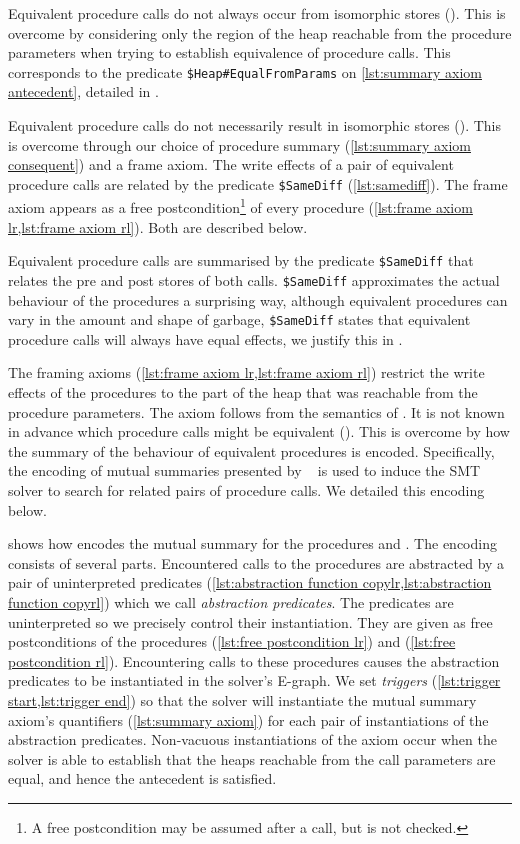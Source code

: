 \documentclass[runningheads,a4paper]{llncs}
\begin{document}
Equivalent procedure calls do not always occur from isomorphic stores (\textbf{\ctwo{}}). This is overcome by considering only the region of the heap reachable from the procedure parameters when trying to establish equivalence of procedure calls. This corresponds to the predicate \texttt{\$Heap\#EqualFromParams} on \cref{lst:summary axiom antecedent}, detailed in .

Equivalent procedure calls do not necessarily result in isomorphic stores (\textbf{\cthree}). This is overcome through our choice of procedure summary (\cref{lst:summary axiom consequent}) and a frame axiom. The write effects of a pair of equivalent procedure calls are related by the predicate \texttt{\$SameDiff} (\cref{lst:samediff}). The frame axiom appears as a free postcondition\footnote{A free postcondition may be assumed after a call, but is not checked.} of every procedure (\cref{lst:frame axiom lr,lst:frame axiom rl}).  Both are described below.

Equivalent procedure calls are summarised by the predicate \texttt{\$SameDiff} that relates the pre and post stores of both calls. \texttt{\$SameDiff} approximates the actual behaviour of the procedures a surprising way, although equivalent procedures can vary in the amount and shape of garbage, \texttt{\$SameDiff} states that equivalent procedure calls will always have equal effects, we justify this in .

The framing axioms (\cref{lst:frame axiom lr,lst:frame axiom rl}) restrict the write effects of the procedures to the part of the heap that was reachable from the procedure parameters. The axiom follows from the semantics of \lang{}. 
It is not known in advance which procedure calls might be equivalent (\textbf{\cfour{}}). This is overcome by how the summary of the behaviour of equivalent procedures is encoded. Specifically, the encoding of mutual summaries presented by \citeauthor{Hawblitzel2013}~\cite{Hawblitzel2013} is used to induce the SMT solver to search for related pairs of procedure calls. We detailed this encoding below.

 shows how \tool{} encodes the mutual summary for the procedures \copylr{} and \copyrl{}. The encoding consists of several parts. Encountered calls to the procedures are abstracted by a pair of uninterpreted predicates (\cref{lst:abstraction function copylr,lst:abstraction function copyrl}) which we call \emph{abstraction predicates}. The predicates are uninterpreted so we precisely control their instantiation. They are given as free postconditions of the procedures \copylr{} (\cref{lst:free postcondition lr}) and \copyrl{} (\cref{lst:free postcondition rl}). Encountering calls to these procedures causes the abstraction predicates to be instantiated in the solver's E-graph. We set \emph{triggers} (\cref{lst:trigger start,lst:trigger end}) so that the solver will instantiate the mutual summary axiom's quantifiers (\cref{lst:summary axiom}) for each pair of instantiations of the abstraction predicates. Non-vacuous instantiations of the axiom occur when the solver is able to establish that the heaps reachable from the call parameters are equal, and hence the antecedent is satisfied.
\end{document}
